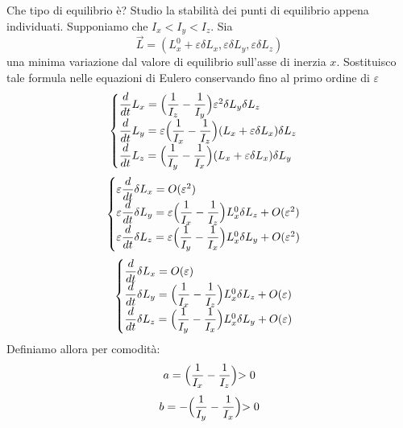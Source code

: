 \documentclass[a4paper,openany]{article}
\begin{document}
	Che tipo di equilibrio è? Studio la stabilità dei punti di equilibrio appena individuati. Supponiamo che $I_x<I_y<I_z$.
	Sia 
	$$
	\vec{L} = (L_x^0 + \varepsilon\delta L_x, \varepsilon\delta L_y,\varepsilon\delta L_z)
	$$
	una minima variazione dal valore di equilibrio sull'asse di inerzia $x$. Sostituisco tale formula nelle equazioni di Eulero conservando fino al primo ordine di $\varepsilon$
	\begin{equation}\label{key}
		\begin{cases}
			\dfrac{d}{dt}L_x = \Bigl(\dfrac{1}{I_z}-\dfrac{1}{I_y}\Bigl) \varepsilon^{2}\delta L_y\delta L_z \\
			\dfrac{d}{dt}L_y =\varepsilon \Bigl(\dfrac{1}{I_x}-\dfrac{1}{I_z}\Bigl)(L_x+\varepsilon\delta L_x)\delta L_z \\
			\dfrac{d}{dt}L_z = \Bigl(\dfrac{1}{I_y}-\dfrac{1}{I_x}\Bigl)(L_x+\varepsilon\delta L_x)\delta L_y
		\end{cases}
	\end{equation}
	\begin{equation}\label{key}
		\begin{cases}
			\varepsilon\dfrac{d}{dt}\delta L_x =O(\varepsilon^2)\\
			\varepsilon\dfrac{d}{dt}\delta L_y =\varepsilon \Bigl(\dfrac{1}{I_x}-\dfrac{1}{I_z}\Bigl)L_x^{0}\delta L_z + O(\varepsilon^2) \\
			\varepsilon \dfrac{d}{dt}\delta L_z =\varepsilon \Bigl(\dfrac{1}{I_y}-\dfrac{1}{I_x}\Bigl)L_x^{0}\delta L_y + O(\varepsilon^2)
		\end{cases}
	\end{equation}	
	\begin{equation}\label{key}
		\begin{cases}
			\dfrac{d}{dt}\delta L_x =O(\varepsilon)\\
			\dfrac{d}{dt}\delta L_y = \Bigl(\dfrac{1}{I_x}-\dfrac{1}{I_z}\Bigl)L_x^{0}\delta L_z + O(\varepsilon) \\
			\dfrac{d}{dt}\delta L_z = \Bigl(\dfrac{1}{I_y}-\dfrac{1}{I_x}\Bigl)L_x^{0}\delta L_y + O(\varepsilon)
		\end{cases}
	\end{equation}	
	Definiamo allora per comodità:
	\begin{equation}\label{key}
		a = \Bigl(\dfrac{1}{I_x}-\dfrac{1}{I_z}\Bigl) > 0 
	\end{equation}
	\begin{equation*}\label{key}
		b =- \Bigl(\dfrac{1}{I_y}-\dfrac{1}{I_x}\Bigl) > 0
	\end{equation*}
\end{document}
